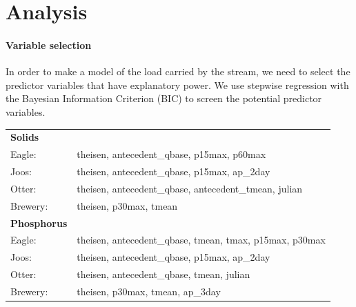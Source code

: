 \documentclass[12pt]{article}
\begin{document}
\section{Analysis}

\paragraph{Variable selection} In order to make a model of the load carried by the stream, we need to select the predictor variables that have explanatory power. We use stepwise regression with the Bayesian Information Criterion (BIC) to screen the potential predictor variables.

\begin{table}[h]
    \begin{center}
    \begin{tabular}{ll}
        \textbf{Solids} & \\
        \hspace{5mm} Eagle: & theisen, antecedent\_qbase, p15max, p60max\\
        \hspace{5mm} Joos: & theisen, antecedent\_qbase, p15max, ap\_2day\\
        \hspace{5mm} Otter: & theisen, antecedent\_qbase, antecedent\_tmean, julian\\
        \hspace{5mm} Brewery: & theisen, p30max, tmean
    \vspace{2mm}\\
        \textbf{Phosphorus} & \\
        \hspace{5mm} Eagle: & theisen, antecedent\_qbase, tmean, tmax, p15max, p30max\\
        \hspace{5mm} Joos: & theisen, antecedent\_qbase, p15max, ap\_2day\\
        \hspace{5mm} Otter: & theisen, antecedent\_qbase, tmean, julian\\
        \hspace{5mm} Brewery: & theisen, p30max, tmean, ap\_3day\\
    \end{tabular}
    \end{center}
\end{table}
\end{document}

